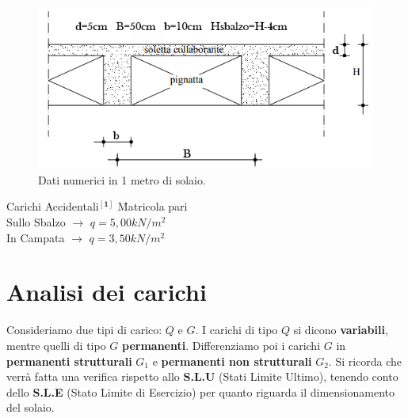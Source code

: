 \documentclass[a4paper,12pt, oneside]{book}
\begin{document}
	\begin{figure}[H]
		\hspace*{-.4cm}
		\centering
		\includegraphics[width=0.7\linewidth]{"immagini/misure solaio flessione normale"}
		\caption{Dati numerici in 1 metro di solaio.}
		\label{fig:misure-solaio-flessione-normale}
	\end{figure}
	
	\begin{tabbing}
		Carichi Accidentali$^{[\textbf{1}]}$\label{1} \hspace{10em} \= Matricola pari \hspace{1em} \\
		Sullo Sbalzo $\longrightarrow$    \> $q=5,00kN/m^{2}$    \\
		In Campata   $\longrightarrow$    \> $q=3,50kN/m^{2}$                     
	\end{tabbing}	
	
	
	\chapter{Analisi dei carichi}
	
	Consideriamo due tipi di carico: $Q$ e $G$. I carichi di tipo $Q$ si dicono \textbf{variabili}, mentre quelli di tipo $G$ \textbf{permanenti}. Differenziamo poi i carichi $G$ in \textbf{permanenti strutturali} $G_1$ e \textbf{permanenti non strutturali} $G_2$.
    \leavevmode\newline
    \leavevmode\newline
	Si ricorda che verrà fatta una verifica rispetto allo \textbf{S.L.U} (Stati Limite Ultimo), tenendo conto dello \textbf{S.L.E} (Stato Limite di Esercizio) per quanto riguarda il dimensionamento del solaio.
\end{document}

